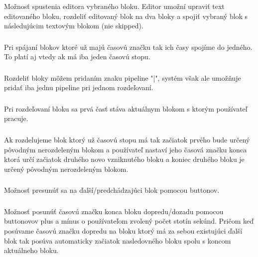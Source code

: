 \documentclass{article}
\begin{document}
\subsubsection{}
Možnosť spustenia editora vybraného bloku. Editor umožní upraviť text editovaného bloku, rozdeliť editovaný blok na dva bloky a spojiť vybraný blok s následujúcim textovým blokom (nie skipped). 

\subsubsection{}
Pri spájaní blokov ktoré už majú časovú značku tak ich časy spojíme do jedného. To platí aj vtedy ak má iba jeden časovú stopu. 

\subsubsection{}
Rozdeliť bloky môžem pridaním znaku pipeline "|", systém však ale umožňuje pridať iba jednu pipeline pri jednom rozdeľovaní.

\subsubsection{}
Pri rozdeľovaní bloku sa prvá časť stáva aktuálnym blokom s ktorým používateľ pracuje. 

\subsubsection{}
Ak rozdelujeme blok ktorý už časovú stopu má tak začiatok prvého bude určený pôvodným nerozdeleným blokom a používateľ nastaví jeho časová značku konca ktorá určí začiatok druhého novo vzniknutého bloku a koniec druhého bloku je určený pôvodným nerozdeleným blokom.

\subsubsection{}
Možnosť presunúť sa na ďalší/predchádzajúci blok pomocou buttonov. 

\subsubsection{}
Možnosť posunúť časovú značku konca bloku dopredu/dozadu pomocou buttonovov plus a mínus o používateľom zvolený počet stotín sekúnd. Pričom keď posúvame časovú značku dopredu na bloku ktorý má za sebou existujúci ďalší blok tak posúva automaticky začiatok nasledovného bloku spolu s koncom aktuálneho bloku.
\end{document}
